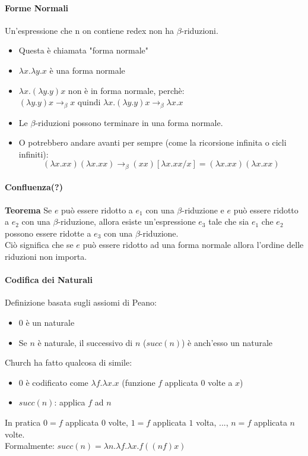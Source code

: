 \documentclass[a4paper,12pt]{article}
\begin{document}
\paragraph{Forme Normali\\}
Un'espressione che n on contiene redex non ha $\beta$-riduzioni.
\begin{itemize}
	\item Questa è chiamata "forma normale"
	\item $\lambda x.\lambda y.x$ è una forma normale
	\item $\lambda x.(\lambda y.y)x$ non è in forma normale, perchè:\\
		$(\lambda y.y)x \rightarrow_{\beta} x$ quindi $\lambda x.(\lambda y.y)x \rightarrow_{\beta} \lambda x.x$
	\item Le $\beta$-riduzioni possono terminare in una forma normale.
	\item O potrebbero andare avanti per sempre (come la ricorsione infinita o cicli infiniti):
		\[ (\lambda x.xx)(\lambda x.xx) \rightarrow_{\beta} (xx)[\lambda x.xx / x] = (\lambda x.xx)(\lambda x.xx) \]
\end{itemize}

\paragraph{Confluenza(?)\\}
\textbf{Teorema} Se $e$ può essere ridotto a $e_{1}$ con una $\beta$-riduzione e $e$ può essere ridotto a $e_{2}$ con una $\beta$-riduzione, allora esiste un'espressione $e_{3}$ tale che sia $e_{1}$ che $e_{2}$ possono essere ridotte a $e_{3}$ con una $\beta$-riduzione.\\
Ciò significa che se $e$ può essere ridotto ad una forma normale allora l'ordine delle riduzioni non importa.

\paragraph{Codifica dei Naturali\\}
Definizione basata sugli assiomi di Peano:
\begin{itemize}
	\item $0$ è un naturale
	\item Se $n$ è naturale, il successivo di $n$ ($succ(n)$) è anch'esso un naturale
\end{itemize}
Church ha fatto qualcosa di simile:
\begin{itemize}
	\item $0$ è codificato come $\lambda f.\lambda x.x$ (funzione $f$ applicata $0$ volte a $x$)
	\item $succ(n)$: applica $f$ ad $n$
\end{itemize}
In pratica $0 = f$ applicata $0$ volte, $1 = f$ applicata $1$ volta, ..., $n = f$ applicata $n$ volte.\\
Formalmente: $succ(n) = \lambda n.\lambda f.\lambda x.f((nf)x)$\\
\end{document}
